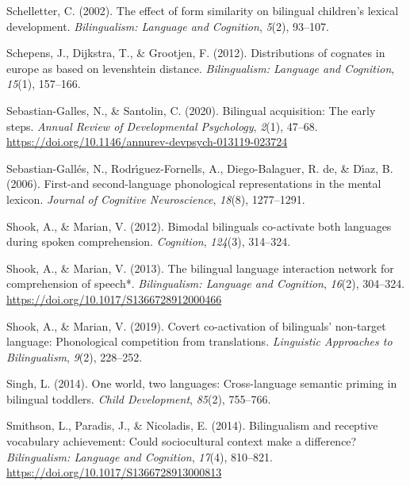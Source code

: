 \documentclass[
]{article}
\newlength{\cslhangindent}
\newlength{\cslentryspacingunit} %
\newenvironment{CSLReferences}[2] %
 {%
  \setlength{\parindent}{0pt}
  \ifodd #1
  \let\oldpar\par
  \def\par{\hangindent=\cslhangindent\oldpar}
  \fi
  \setlength{\parskip}{#2\cslentryspacingunit}
 }%
 {}
\begin{document}
\begin{CSLReferences}{1}{0}
\leavevmode{}%
Schelletter, C. (2002). The effect of form similarity on bilingual
children's lexical development. \emph{Bilingualism: Language and
Cognition}, \emph{5}(2), 93--107.

\leavevmode{}%
Schepens, J., Dijkstra, T., \& Grootjen, F. (2012). Distributions of
cognates in europe as based on levenshtein distance. \emph{Bilingualism:
Language and Cognition}, \emph{15}(1), 157--166.

\leavevmode{}%
Sebastian-Galles, N., \& Santolin, C. (2020). Bilingual acquisition: The
early steps. \emph{Annual Review of Developmental Psychology},
\emph{2}(1), 47--68.
\url{https://doi.org/10.1146/annurev-devpsych-013119-023724}

\leavevmode{}%
Sebastian-Gallés, N., Rodrı́guez-Fornells, A., Diego-Balaguer, R. de, \&
Dı́az, B. (2006). First-and second-language phonological representations
in the mental lexicon. \emph{Journal of Cognitive Neuroscience},
\emph{18}(8), 1277--1291.

\leavevmode{}%
Shook, A., \& Marian, V. (2012). Bimodal bilinguals co-activate both
languages during spoken comprehension. \emph{Cognition}, \emph{124}(3),
314--324.

\leavevmode{}%
Shook, A., \& Marian, V. (2013). The bilingual language interaction
network for comprehension of speech*. \emph{Bilingualism: Language and
Cognition}, \emph{16}(2), 304--324.
\url{https://doi.org/10.1017/S1366728912000466}

\leavevmode{}%
Shook, A., \& Marian, V. (2019). Covert co-activation of bilinguals'
non-target language: Phonological competition from translations.
\emph{Linguistic Approaches to Bilingualism}, \emph{9}(2), 228--252.

\leavevmode{}%
Singh, L. (2014). One world, two languages: Cross-language semantic
priming in bilingual toddlers. \emph{Child Development}, \emph{85}(2),
755--766.

\leavevmode{}%
Smithson, L., Paradis, J., \& Nicoladis, E. (2014). Bilingualism and
receptive vocabulary achievement: Could sociocultural context make a
difference? \emph{Bilingualism: Language and Cognition}, \emph{17}(4),
810--821. \url{https://doi.org/10.1017/S1366728913000813}


\end{CSLReferences}
\end{document}
